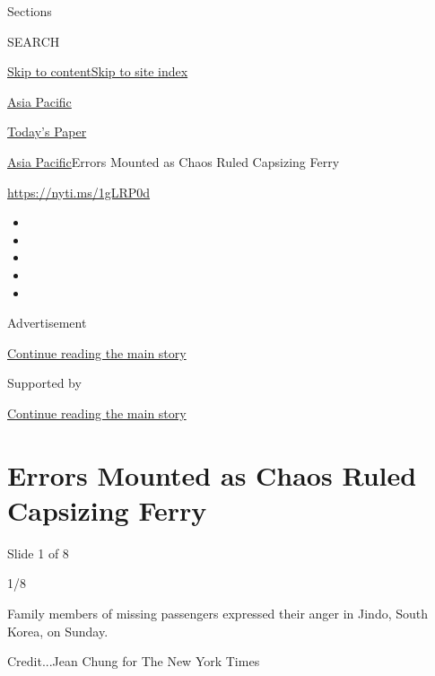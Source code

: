 Sections

SEARCH

\protect\hyperlink{site-content}{Skip to
content}\protect\hyperlink{site-index}{Skip to site index}

\href{https://www.nytimes.com/section/world/asia}{Asia Pacific}

\href{https://myaccount.nytimes.com/auth/login?response_type=cookie\&client_id=vi}{}

\href{https://www.nytimes.com/section/todayspaper}{Today's Paper}

\href{/section/world/asia}{Asia Pacific}\textbar{}Errors Mounted as
Chaos Ruled Capsizing Ferry

\url{https://nyti.ms/1gLRP0d}

\begin{itemize}
\item
\item
\item
\item
\item
\end{itemize}

Advertisement

\protect\hyperlink{after-top}{Continue reading the main story}

Supported by

\protect\hyperlink{after-sponsor}{Continue reading the main story}

\hypertarget{errors-mounted-as-chaos-ruled-capsizing-ferry}{%
\section{Errors Mounted as Chaos Ruled Capsizing
Ferry}\label{errors-mounted-as-chaos-ruled-capsizing-ferry}}

Slide 1 of 8

1/8

Family members of missing passengers expressed their anger in Jindo,
South Korea, on Sunday.

Credit...Jean Chung for The New York Times

